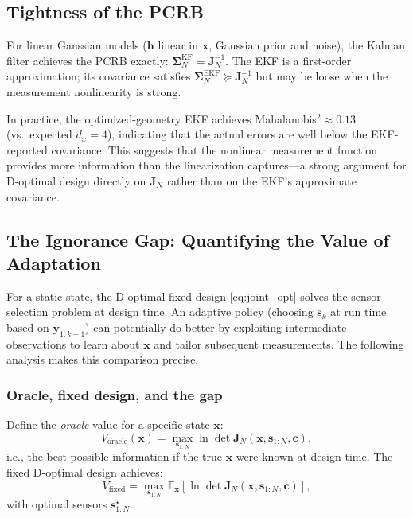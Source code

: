 \documentclass[11pt,a4paper]{article}
\newcommand{\E}{\mathbb{E}}
\begin{document}
\subsection{Tightness of the PCRB}

For linear Gaussian models ($\bm{h}$ linear in $\bm{x}$, Gaussian prior and noise), the Kalman filter achieves the PCRB exactly: $\bm{\Sigma}_N^{\text{KF}} = \bm{J}_N^{-1}$.  The EKF is a first-order approximation; its covariance satisfies $\bm{\Sigma}_N^{\text{EKF}} \succeq \bm{J}_N^{-1}$ but may be loose when the measurement nonlinearity is strong.

In practice, the optimized-geometry EKF achieves Mahalanobis$^2 \approx 0.13$ (vs.\ expected $d_x = 4$), indicating that the actual errors are well below the EKF-reported covariance.  This suggests that the nonlinear measurement function provides more information than the linearization captures---a strong argument for D-optimal design directly on $\bm{J}_N$ rather than on the EKF's approximate covariance.

\subsection{The Ignorance Gap: Quantifying the Value of Adaptation}
\label{subsec:ignorance_gap}

For a static state, the D-optimal fixed design \eqref{eq:joint_opt} solves the sensor selection problem at design time.  An adaptive policy (choosing $\bm{s}_k$ at run time based on $\bm{y}_{1:k-1}$) can potentially do better by exploiting intermediate observations to learn about $\bm{x}$ and tailor subsequent measurements.  The following analysis makes this comparison precise.

\subsubsection{Oracle, fixed design, and the gap}

Define the \emph{oracle} value for a specific state $\bm{x}$:
\begin{equation}
  V_{\text{oracle}}(\bm{x}) = \max_{\bm{s}_{1:N}} \ln\det\bm{J}_N(\bm{x}, \bm{s}_{1:N}, \bm{c}),
  \label{eq:oracle}
\end{equation}
i.e., the best possible information if the true $\bm{x}$ were known at design time.  The fixed D-optimal design achieves:
\begin{equation}
  V_{\text{fixed}} = \max_{\bm{s}_{1:N}} \E_{\bm{x}}\!\left[\ln\det\bm{J}_N(\bm{x}, \bm{s}_{1:N}, \bm{c})\right],
  \label{eq:fixed}
\end{equation}
with optimal sensors $\bm{s}^\star_{1:N}$.
\end{document}
